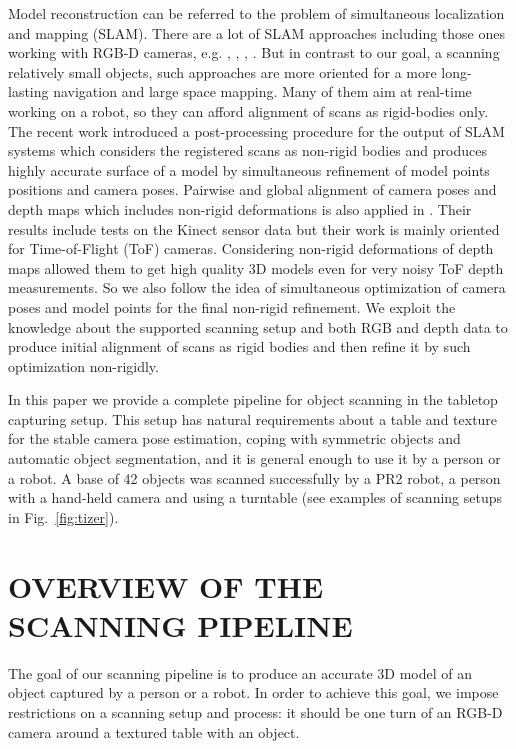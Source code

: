 \documentclass[letterpaper, 10 pt, conference]{ieeeconf}  %
\begin{document}
Model reconstruction can be referred to the problem of simultaneous localization
and mapping (SLAM). There are a lot of SLAM approaches including those ones working
with RGB-D cameras, e.g. \cite{stuckler2012integrating},
\cite{endres2012evaluation}, \cite{henry2012rgb}, \cite{strasdat2011double}. But in contrast to our goal,
a scanning relatively small objects, such approaches are more oriented for
a more long-lasting navigation and large space mapping. Many of them aim at
real-time working on a robot, so they can afford alignment of scans 
as rigid-bodies only. 
The recent work \cite{ruhnke2012highly} introduced a post-processing procedure for the output of SLAM systems
which considers the registered scans as non-rigid bodies and produces highly accurate
surface of a model by simultaneous refinement of model points positions and camera poses.
Pairwise and global alignment of camera poses and depth maps which includes non-rigid 
deformations is also applied in \cite{cui2012algorithms}. Their results include tests on the Kinect
sensor data but their work is mainly oriented for Time-of-Flight (ToF) cameras. Considering non-rigid deformations 
of depth maps allowed them to get high quality 3D models even for very noisy ToF depth measurements.
So we also follow the idea of simultaneous optimization of camera poses and model points 
for the final non-rigid refinement. We exploit the knowledge 
about the supported scanning setup and both RGB and depth 
data to produce initial alignment of scans as rigid bodies
and then refine it by such optimization non-rigidly.

In this paper we provide a complete pipeline for object scanning
in the tabletop capturing setup. This setup has natural requirements
about a table and texture for the stable camera pose estimation,
coping with symmetric objects and automatic object segmentation, and it is general enough
to use it by a person or a robot. A base of 42 objects was
scanned successfully by a PR2 robot, a person with a hand-held camera 
and using a turntable (see examples of scanning setups 
in Fig.~\ref{fig:tizer}).


\section{OVERVIEW OF THE SCANNING PIPELINE}

The goal of our scanning pipeline is to produce an accurate 3D model
of an object captured by a person or a robot.
In order to achieve this goal, we
impose restrictions on a scanning setup and process: it should be
one turn of an RGB-D camera around a textured table with an object. 
\end{document}
